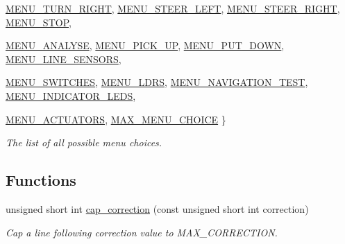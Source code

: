 \begin{DoxyCompactItemize}
\par
\hyperlink{namespaceIDP_ac1d3c3b62448912be4da9f2728f2af99af972ee0a2346477962f78898dfe4523a}{MENU\_\-TURN\_\-RIGHT}, 
\hyperlink{namespaceIDP_ac1d3c3b62448912be4da9f2728f2af99a3eb3b6a326b6104a57b7b09f73afabf4}{MENU\_\-STEER\_\-LEFT}, 
\hyperlink{namespaceIDP_ac1d3c3b62448912be4da9f2728f2af99ae351c54a8e15c97cf27f0e017f495b31}{MENU\_\-STEER\_\-RIGHT}, 
\hyperlink{namespaceIDP_ac1d3c3b62448912be4da9f2728f2af99a1a3e265ab5e1a2afda873da8c1cb7d9f}{MENU\_\-STOP}, 
\par
\hyperlink{namespaceIDP_ac1d3c3b62448912be4da9f2728f2af99aa80af753125b39e64ca61a80af90a880}{MENU\_\-ANALYSE}, 
\hyperlink{namespaceIDP_ac1d3c3b62448912be4da9f2728f2af99ab11c40c94a75f45496a1898bc99516e4}{MENU\_\-PICK\_\-UP}, 
\hyperlink{namespaceIDP_ac1d3c3b62448912be4da9f2728f2af99a85d840a85645d3a127b785df78387d6f}{MENU\_\-PUT\_\-DOWN}, 
\hyperlink{namespaceIDP_ac1d3c3b62448912be4da9f2728f2af99a1454106f5e7503695da693c6acc3157d}{MENU\_\-LINE\_\-SENSORS}, 
\par
\hyperlink{namespaceIDP_ac1d3c3b62448912be4da9f2728f2af99a88c747088c71c27488b3f6b7329c82d1}{MENU\_\-SWITCHES}, 
\hyperlink{namespaceIDP_ac1d3c3b62448912be4da9f2728f2af99a23b85d38bad05a11ce6e04afa51e0739}{MENU\_\-LDRS}, 
\hyperlink{namespaceIDP_ac1d3c3b62448912be4da9f2728f2af99abab1528689e53a7505abeef47c6ca67e}{MENU\_\-NAVIGATION\_\-TEST}, 
\hyperlink{namespaceIDP_ac1d3c3b62448912be4da9f2728f2af99afddaf453d9ae15169ca218fa9e0ab077}{MENU\_\-INDICATOR\_\-LEDS}, 
\par
\hyperlink{namespaceIDP_ac1d3c3b62448912be4da9f2728f2af99af06417b3ca00a4111eca5d60d0ac4c5a}{MENU\_\-ACTUATORS}, 
\hyperlink{namespaceIDP_ac1d3c3b62448912be4da9f2728f2af99a01973890c4a02e0650a9043c790228fd}{MAX\_\-MENU\_\-CHOICE}
 \}
\begin{DoxyCompactList}\small\item\em The list of all possible menu choices. \item\end{DoxyCompactList}\end{DoxyCompactItemize}
\subsection*{Functions}
\begin{DoxyCompactItemize}
\item 
unsigned short int \hyperlink{namespaceIDP_ae66b1b69bcde3ba7995f2fd46c6f21f5}{cap\_\-correction} (const unsigned short int correction)
\begin{DoxyCompactList}\small\item\em Cap a line following correction value to MAX\_\-CORRECTION. \item\end{DoxyCompactList}\end{DoxyCompactItemize}
